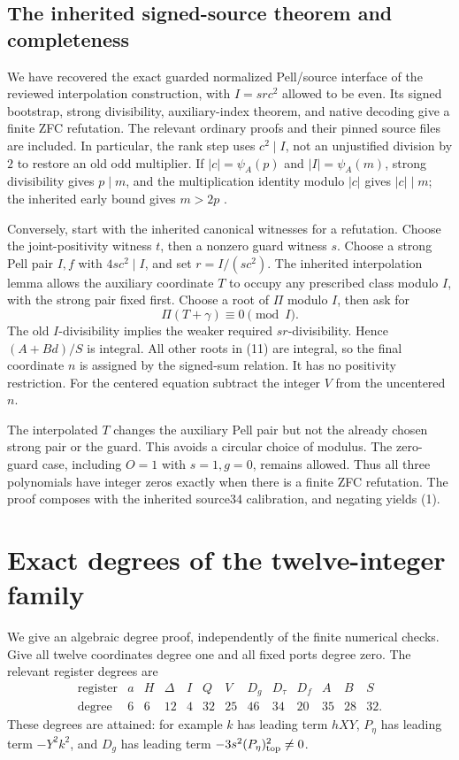 \documentclass[11pt,letterpaper]{article}
\theoremstyle{definition}\newtheorem{definition}[theorem]{Definition}
\theoremstyle{remark}\newtheorem{remark}[theorem]{Remark}
\begin{document}
\subsection{The inherited signed-source theorem and completeness}
We have recovered the exact guarded normalized Pell/source interface of the reviewed interpolation construction, with $I=src^2$ allowed to be even. Its signed bootstrap, strong divisibility, auxiliary-index theorem, and native decoding give a finite ZFC refutation. The relevant ordinary proofs and their pinned source files are included. In particular, the rank step uses $c^2\mid I$, not an unjustified division by $2$ to restore an old odd multiplier. If $|c|=\psi_A(p)$ and $|I|=\psi_A(m)$, strong divisibility gives $p\mid m$, and the multiplication identity modulo $|c|$ gives $|c|\mid m$; the inherited early bound gives $m>2p$ \cite{interp,prime3}.

Conversely, start with the inherited canonical witnesses for a refutation. Choose the joint-positivity witness $t$, then a nonzero guard witness $s$. Choose a strong Pell pair $I,f$ with $4sc^2\mid I$, and set $r=I/(sc^2)$. The inherited interpolation lemma allows the auxiliary coordinate $T$ to occupy any prescribed class modulo $I$, with the strong pair fixed first. Choose a root of $\Pi$ modulo $I$, then ask for
\[
 \Pi(T+\gamma)\equiv0\pmod I.
\]
The old $I$-divisibility implies the weaker required $sr$-divisibility. Hence $(A+Bd)/S$ is integral. All other roots in (11) are integral, so the final coordinate $n$ is assigned by the signed-sum relation. It has no positivity restriction. For the centered equation subtract the integer $V$ from the uncentered $n$.

The interpolated $T$ changes the auxiliary Pell pair but not the already chosen strong pair or the guard. This avoids a circular choice of modulus. The zero-guard case, including $O=1$ with $s=1,g=0$, remains allowed. Thus all three polynomials have integer zeros exactly when there is a finite ZFC refutation. The proof composes with the inherited source34 calibration, and negating yields (1).

\section{Exact degrees of the twelve-integer family}
We give an algebraic degree proof, independently of the finite numerical checks. Give all twelve coordinates degree one and all fixed ports degree zero. The relevant register degrees are
\[
\begin{array}{c|rrrrrrrrrrrr}
\text{register}&a&H&\Delta&I&Q&V&D_g&D_\tau&D_f&A&B&S\\\hline
\text{degree}&6&6&12&4&32&25&46&34&20&35&28&32.
\end{array}
\]
These degrees are attained: for example $k$ has leading term $hXY$, $P_\eta$ has leading term $-Y^2k^2$, and $D_g$ has leading term $-3s^2(P_\eta)_{\rm top}^2\ne0$.
\end{document}
